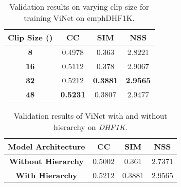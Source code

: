 \documentclass[letterpaper, 10 pt, conference]{ieeeconf}  \usepackage{times}
\begin{document}
\begin{table}[]
    \begin{center}
    
    \begin{tabular}{|c|ccc|}
    \hline
       \textbf{Clip Size ()} & CC  & SIM & NSS \\
    \hline\hline
    \textbf{8}           &0.4978	&0.363	&2.8221 \\
    \textbf{16}           &0.5112	&0.378	&2.9067 \\
    \textbf{32}          &0.5212	&\textbf{0.3881}	&\textbf{2.9565} \\
    \textbf{48}          &\textbf{0.5231}	&0.3807	&2.9477 \\
    \hline
    \end{tabular}
    \end{center}
    \caption{Validation results on varying clip size for training ViNet on emph{DHF1K}.}
    \label{tab:clip_length}
\end{table}

\begin{table}[]
    \begin{center}
        
    \begin{tabular}{|c|ccc|}
    \hline
       \textbf{Model Architecture} & CC  & SIM & NSS \\
    \hline\hline
    \textbf{Without Hierarchy}           &0.5002	&0.361	&2.7371 \\
    \textbf{With Hierarchy}           &0.5212	&0.3881	&2.9565 \\
    \hline
    \end{tabular}
    \end{center}
    \caption{Validation results of ViNet with and without hierarchy on \emph{DHF1K}.}
    \label{tab:hierarchy}
\end{table}
\end{document}
